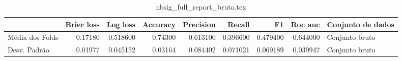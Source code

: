 \begin{table}
\centering
\caption{nbsig_full_report_bruto.tex}
\label{nbsig_full_report_bruto.tex}
\begin{tabular}{lrrrrrrrl}
\toprule
{}              &  Brier  loss &  Log loss &  Accuracy  &  Precision  &   Recall  &       F1  &  Roc auc  & Conjunto de dados \\
\midrule
Média dos Folds &      0.17180 &  0.518600 &    0.74300 &    0.613100 &  0.396600 &  0.479400 &  0.644000 &    Conjunto bruto \\
Desv. Padrão    &      0.01977 &  0.045152 &    0.03164 &    0.084402 &  0.071021 &  0.069189 &  0.039947 &    Conjunto bruto \\
\bottomrule
\end{tabular}
\end{table}

